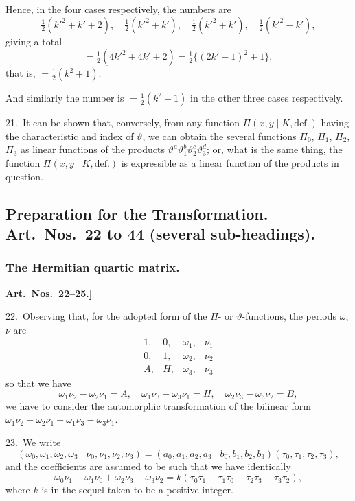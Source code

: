 \documentclass[11pt,a4paper]{article}
\theoremstyle{definition}
\begin{document}
Hence, in the four cases respectively, the numbers are
\[
\tfrac{1}{2}(k'^2 + k' + 2), \quad \tfrac{1}{2}(k'^2 + k'), \quad \tfrac{1}{2}(k'^2 + k'), \quad \tfrac{1}{2}(k'^2 - k'),
\]
giving a total
\[
= \tfrac{1}{2}(4k'^2 + 4k' + 2) = \tfrac{1}{2}\{(2k' + 1)^2 + 1\},
\]
that is, $= \frac{1}{2}(k^2 + 1)$.

And similarly the number is $= \frac{1}{2}(k^2 + 1)$ in the other three cases respectively.

\medskip

21.\ It can be shown that, conversely, from any function $\Pi(x, y \mid K, \text{def.})$ having the characteristic and index of $\vartheta$, we can obtain the several functions $\Pi_0$, $\Pi_1$, $\Pi_2$, $\Pi_3$ as linear functions of the products $\vartheta^a\vartheta_1^b\vartheta_2^c\vartheta_3^d$; or, what is the same thing, the function $\Pi(x, y \mid K, \text{def.})$ is expressible as a linear function of the products in question.

\newpage

\subsection*{Preparation for the Transformation. Art.~Nos.\ 22 to 44 (several sub-headings).}

\subsubsection*{The Hermitian quartic matrix.}

\textbf{Art.~Nos.~22--25.]
}

22.\ Observing that, for the adopted form of the $\Pi$- or $\vartheta$-functions, the periods $\omega$, $\nu$ are
\[
\begin{matrix}
1, & 0, & \omega_1, & \nu_1\\
0, & 1, & \omega_2, & \nu_2\\
A, & H, & \omega_3, & \nu_3
\end{matrix}
\]
so that we have
\[
\omega_1\nu_2 - \omega_2\nu_1 = A, \quad \omega_1\nu_3 - \omega_3\nu_1 = H, \quad \omega_2\nu_3 - \omega_3\nu_2 = B,
\]
we have to consider the automorphic transformation of the bilinear form $\omega_1\nu_2 - \omega_2\nu_1 + \omega_1\nu_3 - \omega_3\nu_1$.

\medskip

23.\ We write
\[
(\omega_0, \omega_1, \omega_2, \omega_3 \mid \nu_0, \nu_1, \nu_2, \nu_3) = (a_0, a_1, a_2, a_3 \mid b_0, b_1, b_2, b_3)(\tau_0, \tau_1, \tau_2, \tau_3),
\]
and the coefficients are assumed to be such that we have identically
\[
\omega_0\nu_1 - \omega_1\nu_0 + \omega_2\nu_3 - \omega_3\nu_2 = k(\tau_0\tau_1 - \tau_1\tau_0 + \tau_2\tau_3 - \tau_3\tau_2),
\]
where $k$ is in the sequel taken to be a positive integer.
\end{document}

